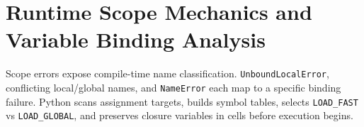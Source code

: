 \section{Runtime Scope Mechanics and Variable Binding Analysis}

Scope errors expose compile-time name classification. \texttt{UnboundLocalError}, conflicting local/global names, and \texttt{NameError} each map to a specific binding failure. Python scans assignment targets, builds symbol tables, selects \texttt{LOAD\_FAST} vs \texttt{LOAD\_GLOBAL}, and preserves closure variables in cells before execution begins.

